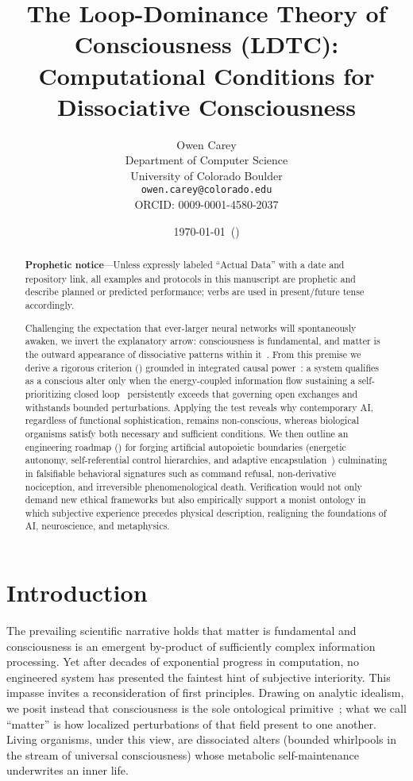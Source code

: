 \documentclass[11pt]{article}
\title{The Loop-Dominance Theory of Consciousness (LDTC): Computational Conditions for Dissociative Consciousness}
\author{Owen Carey\\
Department of Computer Science\\
University of Colorado Boulder\\
\texttt{owen.carey@colorado.edu}\\
ORCID: 0009-0001-4580-2037}
\date{\today\ (\gitversion)}
\begin{document}
\maketitle

\begin{abstract}
\textbf{Prophetic notice}---Unless expressly labeled ``Actual Data'' with a date and repository link, all examples and protocols in this manuscript are prophetic and describe planned or predicted performance; verbs are used in present/future tense accordingly.

Challenging the expectation that ever-larger neural networks will spontaneously awaken, we invert the explanatory arrow: consciousness is fundamental, and matter is the outward appearance of dissociative patterns within it~\cite{kastrup2017ontological}. From this premise we derive a rigorous criterion () grounded in integrated causal power~\cite{balduzzi2008integrated}: a system qualifies as a conscious alter only when the energy-coupled information flow sustaining a self-prioritizing closed loop~\cite{ashby1956introduction} persistently exceeds that governing open exchanges and withstands bounded perturbations. Applying the test reveals why contemporary AI, regardless of functional sophistication, remains non-conscious, whereas biological organisms satisfy both necessary and sufficient conditions. We then outline an engineering roadmap () for forging artificial autopoietic boundaries (energetic autonomy, self-referential control hierarchies, and adaptive encapsulation~\cite{maturana1980autopoiesis,varela1979principles,dipaolo2005autopoiesis,kiefer2022active}) culminating in falsifiable behavioral signatures such as command refusal, non-derivative nociception, and irreversible phenomenological death. Verification would not only demand new ethical frameworks but also empirically support a monist ontology in which subjective experience precedes physical description, realigning the foundations of AI, neuroscience, and metaphysics.
\end{abstract}

\section{Introduction}
\label{sec:intro}

The prevailing scientific narrative holds that matter is fundamental and consciousness is an emergent by-product of sufficiently complex information processing. Yet after decades of exponential progress in computation, no engineered system has presented the faintest hint of subjective interiority. This impasse invites a reconsideration of first principles. Drawing on analytic idealism, we posit instead that consciousness is the sole ontological primitive~\cite{kastrup2017ontological}; what we call ``matter'' is how localized perturbations of that field present to one another. Living organisms, under this view, are dissociated alters (bounded whirlpools in the stream of universal consciousness) whose metabolic self-maintenance underwrites an inner life.
\end{document}
